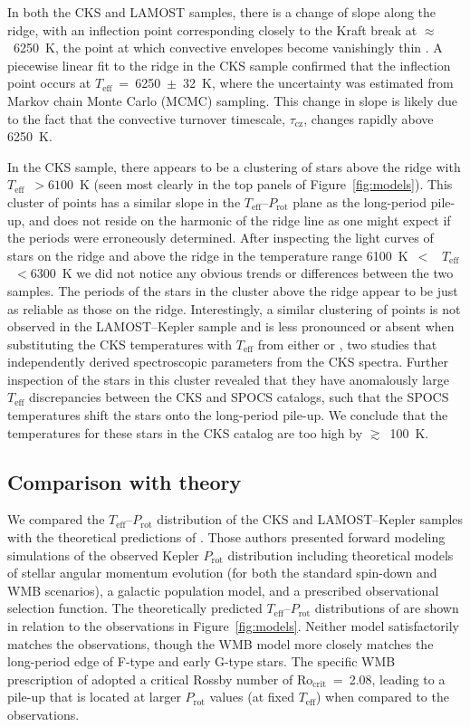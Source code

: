 \documentclass[linenumbers,tighten,trackchanges,twocolumn]{aastex631}
\newcommand{\taucz}{$\tau_\mathrm{cz}$\xspace}
\newcommand{\rocrit}{$\mathrm{Ro_{crit}}$\xspace}
\newcommand{\teff}{\ensuremath{T_{\mathrm{eff}}}\xspace}
\newcommand{\prot}{\ensuremath{P_\mathrm{rot}}\xspace}
\begin{document}
In both the CKS and LAMOST samples, there is a change of slope along the ridge, with an inflection point corresponding closely to the Kraft break at $\approx$~6250~K, the point at which convective envelopes become vanishingly thin \citep{Kraft1967}. A piecewise linear fit to the ridge in the CKS sample confirmed that the inflection point occurs at \teff~=~6250~$\pm$~32~K, where the uncertainty was estimated from Markov chain Monte Carlo (MCMC) sampling. This change in slope is likely due to the fact that the convective turnover timescale, \taucz, changes rapidly above 6250~K.

In the CKS sample, there appears to be a clustering of stars above the ridge with \teff~$>6100$~K (seen most clearly in the top panels of Figure~\ref{fig:models}). This cluster of points has a similar slope in the \teff--\prot plane as the long-period pile-up, and does not reside on the harmonic of the ridge line as one might expect if the periods were erroneously determined. After inspecting the light curves of stars on the ridge and above the ridge in the temperature range 6100~K~$<$~ \teff~$<6300$~K we did not notice any obvious trends or differences between the two samples. The periods of the stars in the cluster above the ridge appear to be just as reliable as those on the ridge. Interestingly, a similar clustering of points is not observed in the LAMOST--Kepler sample and is less pronounced or absent when substituting the CKS temperatures with \teff from either \citet{Brewer2018} or \citet{Martinez2019}, two studies that independently derived spectroscopic parameters from the CKS spectra. Further inspection of the stars in this cluster revealed that they have anomalously large \teff discrepancies between the CKS and SPOCS catalogs, such that the SPOCS temperatures shift the stars onto the long-period pile-up. We conclude that the temperatures for these stars in the CKS catalog are too high by $\gtrsim$~100~K.

\subsection{Comparison with theory}
\label{subsec:models}

We compared the \teff--\prot distribution of the CKS and LAMOST--Kepler samples with the theoretical predictions of \citet{vanSaders2019}. Those authors presented forward modeling simulations of the observed Kepler \prot distribution including theoretical models of stellar angular momentum evolution (for both the standard spin-down and WMB scenarios), a galactic population model, and a prescribed observational selection function. The theoretically predicted \teff--\prot distributions of \citet{vanSaders2019} are shown in relation to the observations in Figure~\ref{fig:models}. Neither model satisfactorily matches the observations, though the WMB model more closely matches the long-period edge of F-type and early G-type stars. The specific WMB prescription of \citet{vanSaders2019} adopted a critical Rossby number of \rocrit~=~2.08, leading to a pile-up that is located at larger \prot values (at fixed \teff) when compared to the observations. 
\end{document}
